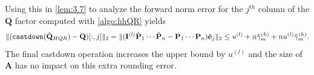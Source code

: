 \documentclass[review,onefignum,onetabnum]{siamart190516}
\newcommand{\tth}{\theta}
\newcommand{\bb}[1]{\mathbf{#1}}
\newcommand{\cO}{\mathcal{O}}
\begin{document}
Using this in \cref{lem:3.7} to analyze the forward norm error for the $j^{th}$ column of the $\bb{Q}$ factor computed with \cref{algo:hhQR} yields
\begin{equation}
\|(\text{\tt castdown}(\hat{\bb{Q}}_{HQR})- \bb{Q})[:,j]\|_2 = \|(\bb{I}^{(l)}\hat{\bb{P}}_{1}\cdots\hat{\bb{P}}_{n}-\bb{P}_{1}\cdots\bb{P}_{n})\hat{\bb{e}}_j\|_2 \leq u^{(l)}+n\tilde{\gamma}_m^{(h)} + nu^{(l)}\tilde{\gamma}_m^{(h)}.\label{eqn:HQR-mp}
\end{equation}
The final castdown operation increases the upper bound by $u^{(l)}$ and the size of $\bb{A}$ has no impact on this extra rounding error. 
\end{document}
